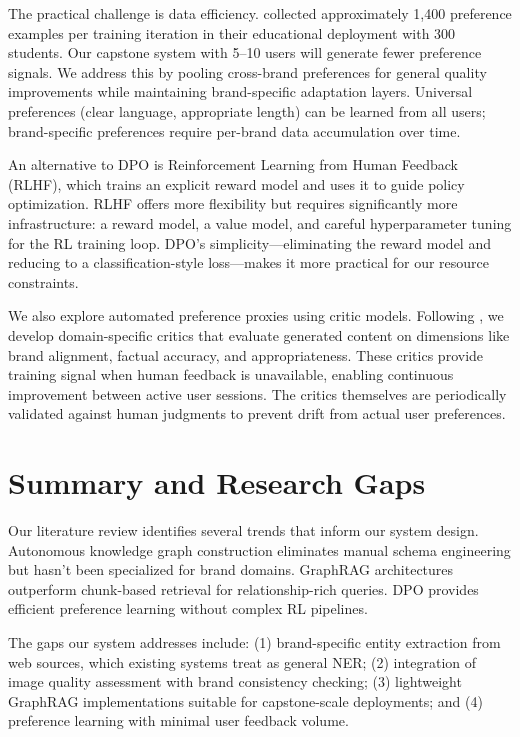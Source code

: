 \documentclass[11pt, twocolumn]{article}
\begin{document}
The practical challenge is data efficiency. \cite{Woodrow2025} collected approximately 1,400 preference examples per training iteration in their educational deployment with 300 students. Our capstone system with 5--10 users will generate fewer preference signals. We address this by pooling cross-brand preferences for general quality improvements while maintaining brand-specific adaptation layers. Universal preferences (clear language, appropriate length) can be learned from all users; brand-specific preferences require per-brand data accumulation over time.

An alternative to DPO is Reinforcement Learning from Human Feedback (RLHF), which trains an explicit reward model and uses it to guide policy optimization. RLHF offers more flexibility but requires significantly more infrastructure: a reward model, a value model, and careful hyperparameter tuning for the RL training loop. DPO's simplicity---eliminating the reward model and reducing to a classification-style loss---makes it more practical for our resource constraints.

We also explore automated preference proxies using critic models. Following \cite{Woodrow2025}, we develop domain-specific critics that evaluate generated content on dimensions like brand alignment, factual accuracy, and appropriateness. These critics provide training signal when human feedback is unavailable, enabling continuous improvement between active user sessions. The critics themselves are periodically validated against human judgments to prevent drift from actual user preferences.

\section{Summary and Research Gaps}

Our literature review identifies several trends that inform our system design. Autonomous knowledge graph construction eliminates manual schema engineering but hasn't been specialized for brand domains. GraphRAG architectures outperform chunk-based retrieval for relationship-rich queries. DPO provides efficient preference learning without complex RL pipelines.

The gaps our system addresses include: (1) brand-specific entity extraction from web sources, which existing systems treat as general NER; (2) integration of image quality assessment with brand consistency checking; (3) lightweight GraphRAG implementations suitable for capstone-scale deployments; and (4) preference learning with minimal user feedback volume.
\end{document}
